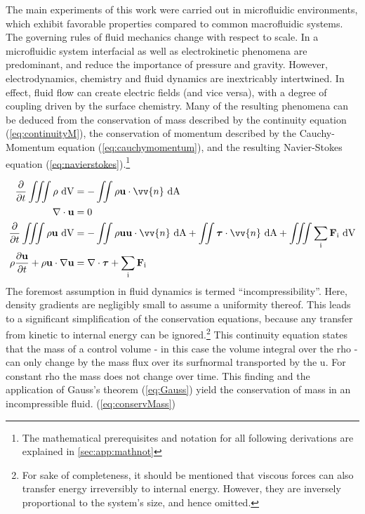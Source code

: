 \label{sec:theo:incomp}

The main experiments of this work were carried out in microfluidic environments, which exhibit favorable properties compared to common macrofluidic systems. The governing rules of fluid mechanics change with respect to scale. In a microfluidic system interfacial as well as electrokinetic phenomena are predominant, and reduce the importance of pressure and gravity.\cite{lit:fluidic:kirby} However, electrodynamics, chemistry and fluid dynamics are inextricably intertwined. In effect, fluid flow can create electric fields (and vice versa), with a degree of coupling driven by the surface chemistry. Many of the resulting phenomena can be deduced from the conservation of mass described by the continuity equation (\cref{eq:continuityM}), the conservation of momentum described by the Cauchy-Momentum equation (\cref{eq:cauchymomentum}), and the resulting Navier-Stokes equation (\cref{eq:navierstokes}).\footnote{The mathematical prerequisites and notation for all following derivations are explained in \cref{sec:app:mathnot}}

\begin{align}
	\frac{\partial}{\partial t} \iiint \rho \ \mathrm{dV} &= - \iint \rho \mathbf{u} \cdot \vv{n} \ \mathrm{dA} \label{eq:continuityM}\\
	\nabla \cdot \mathbf{u} &= 0 \label{eq:conservMass}\\	
	\frac{\partial}{\partial t} \iiint \rho\mathbf{u} \ \mathrm{dV} &= - \iint \rho \mathbf{u}\mathbf{u} \cdot \vv{n} \ \mathrm{dA} + \iint \boldsymbol{\tau} \cdot \vv{n} \ \mathrm{dA}  + \iiint  \sum_\text{i}\mathbf{F}_\text{i} \ \mathrm{dV} \label{eq:continuityP} \\	
		\rho \frac{\partial \mathbf{u}}{\partial t} + \rho\mathbf{u} \cdot \nabla \mathbf{u} &= \nabla \cdot \boldsymbol{\tau} + \sum_\text{i}\mathbf{F}_\text{i} \label{eq:cauchymomentum} \\			
\end{align}
The foremost assumption in fluid dynamics is termed ``incompressibility''. Here, density gradients are negligibly small to assume a uniformity thereof. This leads to a significant simplification of the conservation equations, because any transfer from kinetic to internal energy can be ignored.\footnote{For sake of completeness, it should be mentioned that viscous forces can also transfer energy irreversibly to internal energy. However, they are inversely proportional to the system's size, and hence omitted.}
This continuity equation states that the mass of a control volume - in this case the volume integral over the \gls{rho} - can only change by the mass flux over its \gls{surfnormal} transported by the \gls{u}. For constant \gls{rho} the mass does not change over time. This finding and the application of Gauss's theorem (\cref{eq:Gauss}) yield the conservation of mass in an incompressible fluid. (\cref{eq:conservMass})



